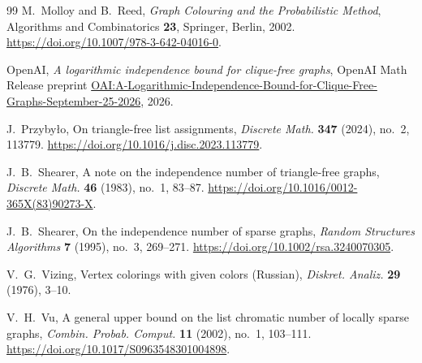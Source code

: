 \begin{thebibliography}{99}
M.~Molloy and B.~Reed,
\emph{Graph Colouring and the Probabilistic Method},
Algorithms and Combinatorics \textbf{23}, Springer, Berlin, 2002.
\url{https://doi.org/10.1007/978-3-642-04016-0}.

OpenAI,
\emph{A logarithmic independence bound for clique-free graphs},
OpenAI Math Release preprint
\href{https://github.com/openai/math/blob/main/preprints/A-Logarithmic-Independence-Bound-for-Clique-Free-Graphs-September-25-2026/paper.pdf}{OAI:A-Logarithmic-Independence-Bound-for-Clique-Free-Graphs-September-25-2026},
2026.

J.~Przyby\l o,
On triangle-free list assignments,
\emph{Discrete Math.} \textbf{347} (2024), no.~2, 113779.
\url{https://doi.org/10.1016/j.disc.2023.113779}.

J.~B.~Shearer,
A note on the independence number of triangle-free graphs,
\emph{Discrete Math.} \textbf{46} (1983), no.~1, 83--87.
\url{https://doi.org/10.1016/0012-365X(83)90273-X}.

J.~B.~Shearer,
On the independence number of sparse graphs,
\emph{Random Structures Algorithms} \textbf{7} (1995), no.~3, 269--271.
\url{https://doi.org/10.1002/rsa.3240070305}.

V.~G.~Vizing,
Vertex colorings with given colors (Russian),
\emph{Diskret. Analiz.} \textbf{29} (1976), 3--10.

V.~H.~Vu,
A general upper bound on the list chromatic number of locally sparse graphs,
\emph{Combin. Probab. Comput.} \textbf{11} (2002), no.~1, 103--111.
\url{https://doi.org/10.1017/S0963548301004898}.

\end{thebibliography}
